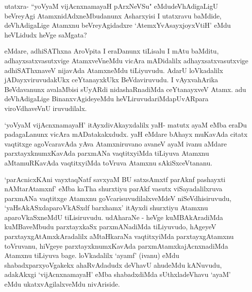 \begin{artha}
utatxra- ``yoV\s yaM vijAcnxnamayaH pArxNeVSu" eMdu\break deVhAdigaLigU beVreyAgi AtamxnidAdxneMbudanunx Asharxyisi I utatxravu baMdide, deVhAdigaLige Atamxnu beVreyAgidadxre `AtemxYvAsayx\-joyxVtiH' eMdu heVLidudx heVge saMgata?
\end{artha}

\begin{artha}%
eMdare, adhiSAThxna AroVpita I eraDanunx tiLisalu I mAtu baMditu, adhayxsatxvasutxvige AtamxveVneMdu vicAra mADidalilx adhayxsatxvasutxvige adhiSAThxnaveV nijavAda AtamxneMdu tiLiyuvudu. AdarU loVkadalilx jADayxviruvudakUkx ceYtanayxkUkx BeVdaviruvudu. I vAyxvahArika BeVdavanunx avalaMbisi sUyARdi nidashaRnadiMda ceYtanayxveV Atamx. adu deVhAdigaLige BinanxvAgideyeMdu heVLiruvudariMda\break pUvARpara viroVdhaveVnU iruvudilalx. 
\end{artha}

\begin{artha}
`yoV\s yaM vijAcnxnamayaH' itAyxdivAkayxdalilx yaH- matutx ayaM eMba eraDu padagaLanunx vicAra mADatakakxdudx. yaH eMdare bAhayx muKavAda citatx vaqtitxge agoVcaravAda yAva Atamxniruvano avaneV ayaM ivanu aMdare parxtayxknumxKavAda parxmANa vaqtitxyiMda tiLiyuva Atamxnu aMtamuRKavAda vaqtitxyiMda toVruva Atamxnu sAkiSxceVtananu. 
\end{artha}

\begin{artha}
`parAcnicxKAni vayxtaqNatf savxyaM BU satxsAmxtf parAknf pashayxti nAMtarAtamxnf' eMba kaTha shurxtiyu parAkf vasutx viSayadalilxruva parxmANa vaqtitxge Atamxnu goVcarisuvudilalxveMdeV niSeVdhisiruvudu, `yaHsAkASxdaparoVkASxdf barxhamx' itAyxdi shurxtiyu Atamxnu aparoVkaSxneMdU tiLisiruvudu. udAharaNe - heVge kuMBAkAradiMda kuMBaveMbudu parxtayxkaSx parxmANadiMda tiLiyuvudo, hAgeyeV parxtayxgAtAmxkAradalilx aMtaHkaraNa vaqtitxyiMda parxtayxgAtamxnu toVruvanu, hiVgeye parxtayxknumxKavAda parxmAtamxkajAcnxnadiMda Atamxnu tiLiyuva bage. loVkadalilx `ayamf' (ivanu) eMdu shabadxparxyoVgakekx ahaRvAdadudx deVhavU ahudeMdu kANuvudu, adakAkxgi `vijAcnxnamayaH' eMba shabadxdiMda sUthxladeVhavu `ayaM' eMdu ukatxvAgilalxveMdu nivAriside.
\end{artha}



